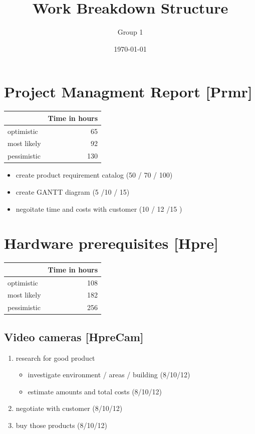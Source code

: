 \documentclass
[
 12pt, %
       DIV12,
       a4paper, %
       oneside, %
       titlepage, %
       parskip=half, %
       headings=normal, %
       listof=totoc, %
       bibliography=totoc, %
       index=totoc, %
       captions=tableheading, %
       ]{scrreprt}
\date{\today}
\title{Work Breakdown Structure}
\author{Group 1}
\begin{document}
\maketitle
\tableofcontents



\chapter{Project Managment Report [Prmr]}
\label{sec:orgd96ec13}
\begin{center}
\begin{tabular}{|l|r|}
	\hline
	 & Time in hours\\
	 \hline
	optimistic & 65\\
	\hline
	most likely & 92\\
	\hline
	pessimistic & 130\\
	\hline
\end{tabular}
\end{center}
\begin{itemize}
\item create product requirement catalog (50 / 70 / 100)
\item create GANTT diagram (5 /10 / 15)
\item negoitate time and costs with customer (10 / 12 /15 )
\end{itemize}

\chapter{Hardware prerequisites [Hpre]}
\label{sec:orgfb33f5b}

\begin{center}
	\begin{tabular}{|l|r|}
		\hline
		& Time in hours\\
		\hline
		optimistic & 108\\
		\hline
		most likely & 182\\
		\hline
		pessimistic & 256\\
		\hline
	\end{tabular}
\end{center}


\section{Video cameras [HpreCam]}
\label{sec:org3a27049}
	\begin{enumerate}
	\item research for good product
	\begin{itemize}
	\item investigate environment / areas / building (8/10/12)
	\item estimate amounts and total costs (8/10/12)
	\end{itemize}
	\item negotiate with customer (8/10/12)
	\item buy those products (8/10/12)
	\end{enumerate}
\end{document}
